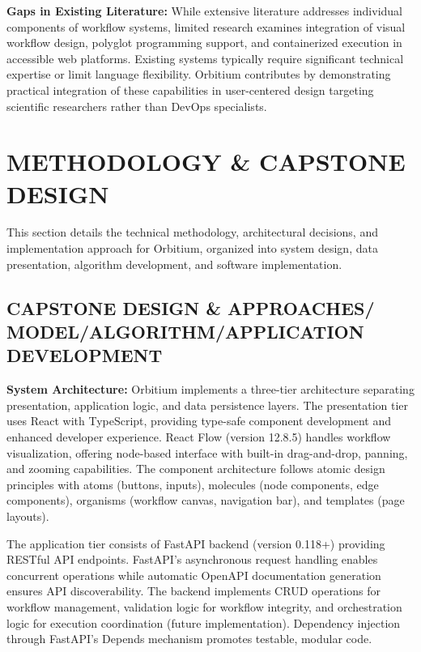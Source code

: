 \documentclass[12pt]{article}
\begin{document}
\hspace{\parindent}\textbf{Gaps in Existing Literature:} While extensive literature addresses individual components of workflow systems, limited research examines integration of visual workflow design, polyglot programming support, and containerized execution in accessible web platforms. Existing systems typically require significant technical expertise or limit language flexibility. Orbitium contributes by demonstrating practical integration of these capabilities in user-centered design targeting scientific researchers rather than DevOps specialists.

\newpage
\section{METHODOLOGY \& CAPSTONE DESIGN}

\hspace{\parindent}This section details the technical methodology, architectural decisions, and implementation approach for Orbitium, organized into system design, data presentation, algorithm development, and software implementation.

\subsection{CAPSTONE DESIGN \& APPROACHES/ MODEL/ALGORITHM/APPLICATION DEVELOPMENT}

\hspace{\parindent}\textbf{System Architecture:} Orbitium implements a three-tier architecture separating presentation, application logic, and data persistence layers. The presentation tier uses React with TypeScript, providing type-safe component development and enhanced developer experience. React Flow (version 12.8.5) handles workflow visualization, offering node-based interface with built-in drag-and-drop, panning, and zooming capabilities. The component architecture follows atomic design principles with atoms (buttons, inputs), molecules (node components, edge components), organisms (workflow canvas, navigation bar), and templates (page layouts).

The application tier consists of FastAPI backend (version 0.118+) providing RESTful API endpoints. FastAPI's asynchronous request handling enables concurrent operations while automatic OpenAPI documentation generation ensures API discoverability. The backend implements CRUD operations for workflow management, validation logic for workflow integrity, and orchestration logic for execution coordination (future implementation). Dependency injection through FastAPI's Depends mechanism promotes testable, modular code.
\end{document}

